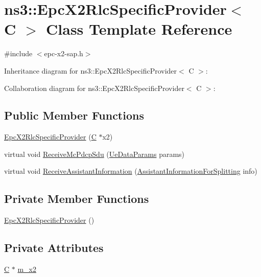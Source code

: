 \hypertarget{classns3_1_1EpcX2RlcSpecificProvider}{}\section{ns3\+:\+:Epc\+X2\+Rlc\+Specific\+Provider$<$ C $>$ Class Template Reference}
\label{classns3_1_1EpcX2RlcSpecificProvider}


{\ttfamily \#include $<$epc-\/x2-\/sap.\+h$>$}



Inheritance diagram for ns3\+:\+:Epc\+X2\+Rlc\+Specific\+Provider$<$ C $>$\+:


Collaboration diagram for ns3\+:\+:Epc\+X2\+Rlc\+Specific\+Provider$<$ C $>$\+:
\subsection*{Public Member Functions}
\begin{DoxyCompactItemize}
\item 
\hyperlink{classns3_1_1EpcX2RlcSpecificProvider_a658fe2e6b07799b059ddf44d1d576839}{Epc\+X2\+Rlc\+Specific\+Provider} (\hyperlink{loss__COST231__small__cities__urban_8m_aaa53ca0b650dfd85c4f59fa156f7a2cc}{C} $\ast$x2)
\item 
virtual void \hyperlink{classns3_1_1EpcX2RlcSpecificProvider_ad19cd4008c7964cd504b8cafdb2da21d}{Receive\+Mc\+Pdcp\+Sdu} (\hyperlink{structns3_1_1EpcX2Sap_1_1UeDataParams}{Ue\+Data\+Params} params)
\item 
virtual void \hyperlink{classns3_1_1EpcX2RlcSpecificProvider_a25bd886addb1c912d87492bac148bfdd}{Receive\+Assistant\+Information} (\hyperlink{structns3_1_1EpcX2Sap_1_1AssistantInformationForSplitting}{Assistant\+Information\+For\+Splitting} info)
\end{DoxyCompactItemize}
\subsection*{Private Member Functions}
\begin{DoxyCompactItemize}
\item 
\hyperlink{classns3_1_1EpcX2RlcSpecificProvider_a6ef7e3b181786b8388f841e04402daf8}{Epc\+X2\+Rlc\+Specific\+Provider} ()
\end{DoxyCompactItemize}
\subsection*{Private Attributes}
\begin{DoxyCompactItemize}
\item 
\hyperlink{loss__COST231__small__cities__urban_8m_aaa53ca0b650dfd85c4f59fa156f7a2cc}{C} $\ast$ \hyperlink{classns3_1_1EpcX2RlcSpecificProvider_a4d9cb42fc51537420e45949a040a4628}{m\+\_\+x2}
\end{DoxyCompactItemize}
